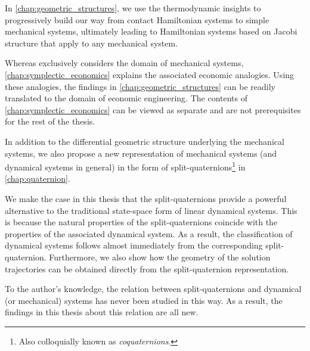 In \cref{chap:geometric_structures}, we use the thermodynamic insights to progressively build our way from contact Hamiltonian systems to simple mechanical systems, ultimately leading to Hamiltonian systems based on Jacobi structure that apply to any mechanical system.
%

Whereas  exclusively considers the domain of mechanical systems, \cref{chap:symplectic_economics} explains the associated economic analogies. Using these analogies, the findings in \cref{chap:geometric_structures} can be readily translated to the domain of economic engineering. 
The contents of \cref{chap:symplectic_economics} can be viewed as separate and are not prerequisites for the rest of the thesis.

In addition to the differential geometric structure underlying the mechanical systems, we also propose a new representation of mechanical systems (and dynamical systems in general) in the form of split-quaternions\footnote{Also colloquially known as \emph{coquaternions}.} in \cref{chap:quaternion}. 

We make the case in this thesis that the split-quaternions provide a powerful alternative to the traditional state-space form of linear dynamical systems. This is because the natural properties of the split-quaternions coincide with the properties of the associated dynamical system. As a result, the classification of dynamical systems follows almost immediately from the corresponding split-quaternion. Furthermore, we also show how the geometry of the solution trajectories can be obtained directly from the split-quaternion representation.

To the author's knowledge, the relation between split-quaternions and dynamical (or mechanical) systems has never been studied in this way. As a result, the findings in this thesis about this relation are all new.
